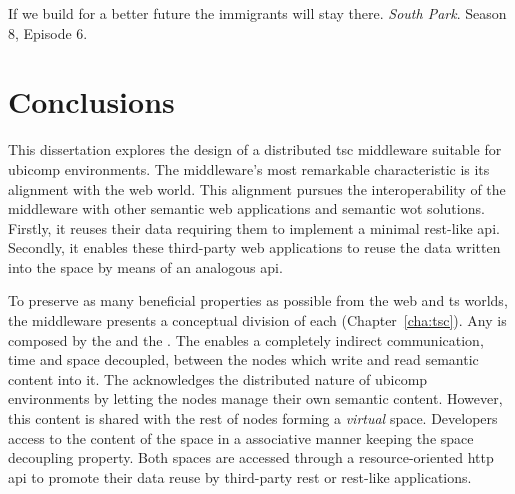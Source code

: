 
\begin{savequote}[50mm]
If we build for a better future the immigrants will stay there.
\emph{South Park}. Season 8, Episode 6.
\end{savequote}


\chapter{Conclusions}
\label{cha:conclusions}


\ifpdf
    \graphicspath{{\pathchapseven/figures/PNG/}{\pathchapseven/figures/PDF/}{\pathchapseven/figures/}}
\else
    \graphicspath{{\pathchapseven/figures/EPS/}{\pathchapseven/figures/}}
\fi




This dissertation explores the design of a distributed \ac{tsc} middleware suitable for \ac{ubicomp} environments.
The middleware's most remarkable characteristic is its alignment with the web world.
This alignment pursues the interoperability of the middleware with other semantic web applications and semantic \ac{wot} solutions.
Firstly, it reuses their data requiring them to implement a minimal \ac{rest}-like \ac{api}.
Secondly, it enables these third-party web applications to reuse the data written into the space by means of an analogous \ac{api}. %


To preserve as many beneficial properties as possible from the web and \ac{ts} worlds, the middleware presents a conceptual division of each \Space{} (Chapter~\ref{cha:tsc}).
Any \Space{} is composed by the \coordspace{} and the \outerspace{}.
The \coordspace{} enables a completely indirect communication, time and space decoupled, between the nodes which write and read semantic content into it.
The \outerspace{} acknowledges the distributed nature of \ac{ubicomp} environments by letting the nodes manage their own semantic content.
However, this content is shared with the rest of nodes forming a \emph{virtual} space.
Developers access to the content of the space in a associative manner keeping the space decoupling property.
Both spaces are accessed through a resource-oriented \ac{http} \ac{api} to promote their data reuse by third-party \ac{rest} or \ac{rest}-like applications.



